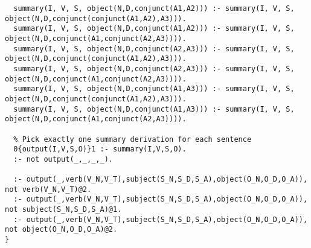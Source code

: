 \begin{lstlisting}
  summary(I, V, S, object(N,D,conjunct(A1,A2))) :- summary(I, V, S, object(N,D,conjunct(conjunct(A1,A2),A3))).
  summary(I, V, S, object(N,D,conjunct(A1,A2))) :- summary(I, V, S, object(N,D,conjunct(A1,conjunct(A2,A3)))).
  summary(I, V, S, object(N,D,conjunct(A2,A3))) :- summary(I, V, S, object(N,D,conjunct(conjunct(A1,A2),A3))).
  summary(I, V, S, object(N,D,conjunct(A2,A3))) :- summary(I, V, S, object(N,D,conjunct(A1,conjunct(A2,A3)))).
  summary(I, V, S, object(N,D,conjunct(A1,A3))) :- summary(I, V, S, object(N,D,conjunct(conjunct(A1,A2),A3))).
  summary(I, V, S, object(N,D,conjunct(A1,A3))) :- summary(I, V, S, object(N,D,conjunct(A1,conjunct(A2,A3)))).

  % Pick exactly one summary derivation for each sentence
  0{output(I,V,S,O)}1 :- summary(I,V,S,O).
  :- not output(_,_,_,_).

  :- output(_,verb(V_N,V_T),subject(S_N,S_D,S_A),object(O_N,O_D,O_A)), not verb(V_N,V_T)@2.
  :- output(_,verb(V_N,V_T),subject(S_N,S_D,S_A),object(O_N,O_D,O_A)), not subject(S_N,S_D,S_A)@1.
  :- output(_,verb(V_N,V_T),subject(S_N,S_D,S_A),object(O_N,O_D,O_A)), not object(O_N,O_D,O_A)@2.
}
\end{lstlisting}
